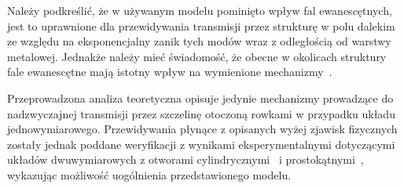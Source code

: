 Należy podkreślić, że w używanym modelu pominięto wpływ fal ewanescętnych, jest to uprawnione dla przewidywania transmisji przez strukturę w polu dalekim ze względu na eksponencjalny zanik tych modów wraz z odległością od warstwy metalowej. Jednakże należy mieć świadomość, że obecne w okolicach struktury fale ewanescętne mają istotny wpływ na wymienione mechanizmy~\cite{ebbesen1998extraordinary}.

Przeprowadzona analiza teoretyczna opisuje jedynie mechanizmy prowadzące do nadzwyczajnej transmisji przez szczelinę otoczoną rowkami w przypadku układu jednowymiarowego. Przewidywania płynące z opisanych wyżej zjawisk fizycznych zostały jednak poddane weryfikacji z wynikami eksperymentalnymi dotyczącymi układów dwuwymiarowych z otworami cylindrycznymi~\cite{ebbesen1998extraordinary} i prostokątnymi~\cite{koerkamp2004strong}, wykazując możliwość uogólnienia przedstawionego modelu.

